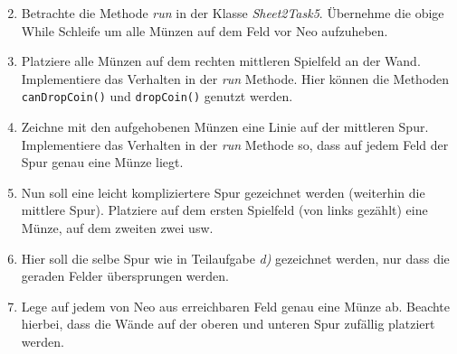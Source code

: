 \begin{enumerate}[label=\alph*)] \setcounter{enumi}{1}
    \item Betrachte die Methode \textit{run} in der Klasse \textit{Sheet2Task5}. Übernehme die obige While Schleife um 
    alle Münzen auf dem Feld vor Neo aufzuheben.
    \item Platziere alle Münzen auf dem rechten mittleren Spielfeld an der Wand. Implementiere das Verhalten in der \textit{run} Methode.
    Hier können die Methoden \lstinline{canDropCoin()} und \lstinline{dropCoin()} genutzt werden.
    \item Zeichne mit den aufgehobenen Münzen eine Linie auf der mittleren Spur. Implementiere das Verhalten in der \textit{run} Methode so, dass 
    auf jedem Feld der Spur genau eine Münze liegt.
    \item Nun soll eine leicht kompliziertere Spur gezeichnet werden (weiterhin die mittlere Spur). Platziere auf dem ersten Spielfeld (von links gezählt)
    eine Münze, auf dem zweiten zwei usw.
    \item Hier soll die selbe Spur wie in Teilaufgabe \textit{d)} gezeichnet werden, nur dass die geraden Felder übersprungen werden.
    \item Lege auf jedem von Neo aus erreichbaren Feld genau eine Münze ab. Beachte hierbei, dass die Wände auf der oberen und unteren Spur zufällig platziert 
    werden.
\end{enumerate}